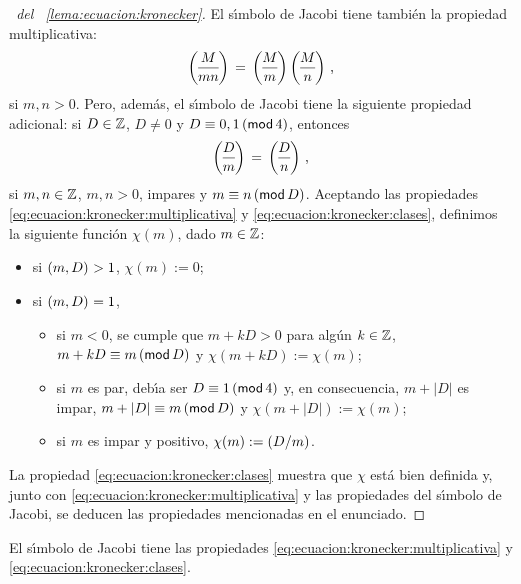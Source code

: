 \begin{proof}[\proofname~del \lemaname~\ref{lema:ecuacion:kronecker}]
	El s\'{\i}mbolo de Jacobi tiene tambi\'en la propiedad multiplicativa:
	\begin{equation}
		\label{eq:ecuacion:kronecker:multiplicativa}
		\jacobi M{mn}\,=\,\jacobi M{m}\,\jacobi M{n}
		\text{ ,}
	\end{equation}
	si $m,n>0$.
	Pero, adem\'as, el s\'{\i}mbolo de Jacobi tiene la siguiente
	propiedad adicional: si $D\in\Enteros$, $D\neq 0$ y
	$D\equiv 0,1\tmodulo[4]$, entonces
	\begin{equation}
		\label{eq:ecuacion:kronecker:clases}
		\jacobi D{m}\,=\,\jacobi D{n}
		\text{ ,}
	\end{equation}
	si $m,n\in\Enteros$, $m,n>0$, impares y $m\equiv n\tmodulo[D]$.
	Aceptando las propiedades \eqref{eq:ecuacion:kronecker:multiplicativa}
	y \eqref{eq:ecuacion:kronecker:clases}, definimos la siguiente
	funci\'on $\chi(m)$, dado $m\in\Enteros$:
	\begin{itemize}
		\item si $\mcd{m,D}>1$, $\chi(m):=0$;
		\item si $\mcd{m,D}=1$,
			\begin{itemize}
				\item si $m<0$, se cumple que $m+kD>0$
					para alg\'un $k\in\Enteros$,
					$m+kD\equiv m\tmodulo[D]$ y
					$\chi(m+kD):=\chi(m)$;
				\item si $m$ es par, deb\'{\i}a ser
					$D\equiv 1\tmodulo[4]$ y, en
					consecuencia, $m+|D|$ es impar,
					$m+|D|\equiv m\tmodulo[D]$ y
					$\chi(m+|D|):=\chi(m)$;
				\item si $m$ es impar y positivo,
					$\chi(m):=\tjacobi D{m}$.
			\end{itemize}
	\end{itemize}
	La propiedad \eqref{eq:ecuacion:kronecker:clases} muestra que $\chi$
	est\'a bien definida y, junto con
	\eqref{eq:ecuacion:kronecker:multiplicativa} y las propiedades del
	s\'{\i}mbolo de Jacobi, se deducen las propiedades mencionadas en el
	enunciado.
\end{proof}

\begin{lemaEcuacion}\label{lema:ecuacion:jacobi}
	El s\'{\i}mbolo de Jacobi tiene las propiedades
	\eqref{eq:ecuacion:kronecker:multiplicativa} y
	\eqref{eq:ecuacion:kronecker:clases}.
\end{lemaEcuacion}


